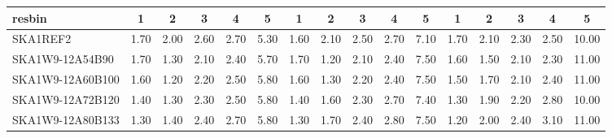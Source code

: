 \begin{table}[H]
{{\begin{tabular}{|lccccc||ccccc||ccccc|}
 resbin  &1 & 2 & 3 & 4 & 5 & 1 & 2 & 3 & 4 & 5 & 1 & 2 & 3 & 4 & 5 \\ \hline
SKA1REF2 & 1.70 \cellcolor{blue!60.00} & 2.00 \cellcolor{red!60.00} & 2.60 \cellcolor{green!60.00} & 2.70 \cellcolor{orange!60.00} & 5.30 \cellcolor{purple!18.00} & 1.60 \cellcolor{blue!49.50} & 2.10 \cellcolor{red!60.00} & 2.50 \cellcolor{green!60.00} & 2.70 \cellcolor{orange!49.50} & 7.10 \cellcolor{purple!18.00} & 1.70 \cellcolor{blue!60.00} & 2.10 \cellcolor{red!60.00} & 2.30 \cellcolor{green!46.00} & 2.50 \cellcolor{orange!28.50} & 10.00 \cellcolor{purple!18.00}\\ \hline 
SKA1W9-12A54B90 & 1.70 \cellcolor{blue!60.00} & 1.30 \cellcolor{red!23.25} & 2.10 \cellcolor{green!18.00} & 2.40 \cellcolor{orange!18.00} & 5.70 \cellcolor{purple!51.60} & 1.70 \cellcolor{blue!60.00} & 1.20 \cellcolor{red!18.00} & 2.10 \cellcolor{green!18.00} & 2.40 \cellcolor{orange!18.00} & 7.50 \cellcolor{purple!60.00} & 1.60 \cellcolor{blue!51.60} & 1.50 \cellcolor{red!18.00} & 2.10 \cellcolor{green!18.00} & 2.30 \cellcolor{orange!18.00} & 11.00 \cellcolor{purple!60.00}\\ \hline 
SKA1W9-12A60B100 & 1.60 \cellcolor{blue!49.50} & 1.20 \cellcolor{red!18.00} & 2.20 \cellcolor{green!26.40} & 2.50 \cellcolor{orange!32.00} & 5.80 \cellcolor{purple!60.00} & 1.60 \cellcolor{blue!49.50} & 1.30 \cellcolor{red!22.67} & 2.20 \cellcolor{green!28.50} & 2.40 \cellcolor{orange!18.00} & 7.50 \cellcolor{purple!60.00} & 1.50 \cellcolor{blue!43.20} & 1.70 \cellcolor{red!32.00} & 2.10 \cellcolor{green!18.00} & 2.40 \cellcolor{orange!23.25} & 11.00 \cellcolor{purple!60.00}\\ \hline 
SKA1W9-12A72B120 & 1.40 \cellcolor{blue!28.50} & 1.30 \cellcolor{red!23.25} & 2.30 \cellcolor{green!34.80} & 2.50 \cellcolor{orange!32.00} & 5.80 \cellcolor{purple!60.00} & 1.40 \cellcolor{blue!28.50} & 1.60 \cellcolor{red!36.67} & 2.30 \cellcolor{green!39.00} & 2.70 \cellcolor{orange!49.50} & 7.40 \cellcolor{purple!49.50} & 1.30 \cellcolor{blue!26.40} & 1.90 \cellcolor{red!46.00} & 2.20 \cellcolor{green!32.00} & 2.80 \cellcolor{orange!44.25} & 10.00 \cellcolor{purple!18.00}\\ \hline 
SKA1W9-12A80B133 & 1.30 \cellcolor{blue!18.00} & 1.40 \cellcolor{red!28.50} & 2.40 \cellcolor{green!43.20} & 2.70 \cellcolor{orange!60.00} & 5.80 \cellcolor{purple!60.00} & 1.30 \cellcolor{blue!18.00} & 1.70 \cellcolor{red!41.33} & 2.40 \cellcolor{green!49.50} & 2.80 \cellcolor{orange!60.00} & 7.50 \cellcolor{purple!60.00} & 1.20 \cellcolor{blue!18.00} & 2.00 \cellcolor{red!53.00} & 2.40 \cellcolor{green!60.00} & 3.10 \cellcolor{orange!60.00} & 11.00 \cellcolor{purple!60.00}\\ \hline 

\end{tabular}}}
\end{table}

